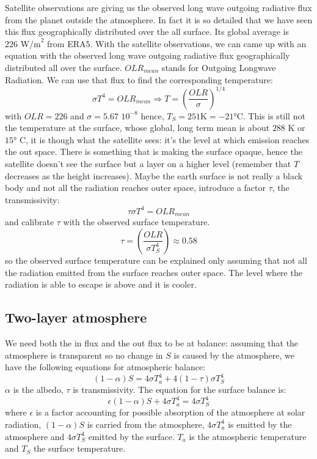 Satellite observations are giving us the observed long wave outgoing radiative flux
from the planet outside the atmosphere. In fact it is so detailed that we have seen this flux geographically distributed over the all surface. Its global average is $226\, \, \text{W/m}^2$ from ERA5. With the satellite observations, we can came up with an equation with the observed long wave outgoing radiative flux geographically distributed all over the surface. $OLR_{mean}$ stands for Outgoing Longwave Radiation.
We can use that flux to find the corresponding temperature:
$$\sigma T^4=OLR_{mean}\Longrightarrow T=\left(\frac{OLR}{\sigma}\right)^{1/4}$$
with $OLR=226$ and $\sigma=5.67 \,\, 10^{-8}$
hence, $T_S=251 \text{K}=-21°\text{C}$. This is still not the temperature at the surface, whose global, long term
mean is about $288$ K or $15°$ C, it is though what the satellite sees: it's the level at which emission reaches the out space. There is something that is making the surface opaque, hence the satellite doesn't see the surface but a layer on a higher level (remember that $T$ decreases as the height increases).
Maybe the earth surface is not really a black body and not all the
radiation reaches outer space, introduce a factor $\tau$, the transmissivity:
$$\tau\sigma T^4=OLR_{mean}$$
and calibrate $\tau$ with the observed surface temperature.
\begin{equation}\label{eq.tau}
	\tau=\left(\frac{OLR}{\sigma T_S^4}\right)\approx 0.58
\end{equation}
so the observed surface temperature can be explained only assuming that not all the radiation emitted from the surface reaches outer space. The level where the radiation is able to escape is above and it is cooler.
\subsection{Two-layer atmosphere}
We need both the in flux and the out flux to be at balance: assuming that the atmosphere is transparent so no change in $S$ is caused by the atmosphere, we have the following equations for atmospheric balance:
\begin{equation}\label{eq.two layer}
	(1-\alpha)S=4\sigma T^4_{a}+4(1-\tau)\sigma T_S^4
\end{equation}
$\alpha$ is the albedo, $\tau$ is transmissivity. The equation for the surface balance is:
\begin{equation}\label{eq.surface balance}
	\epsilon (1-\alpha)S+4\sigma T_a^4=4\sigma T_S^4
\end{equation}
where $\epsilon$ is a factor accounting for possible absorption of the atmosphere at solar radiation, $(1-\alpha)S$  is carried from the atmosphere, $4\sigma T_a^4$ is emitted by the atmosphere and $4\sigma T_S^4$ emitted by the surface.
$T_a$ is the atmospheric temperature and $T_S$ the surface temperature.


